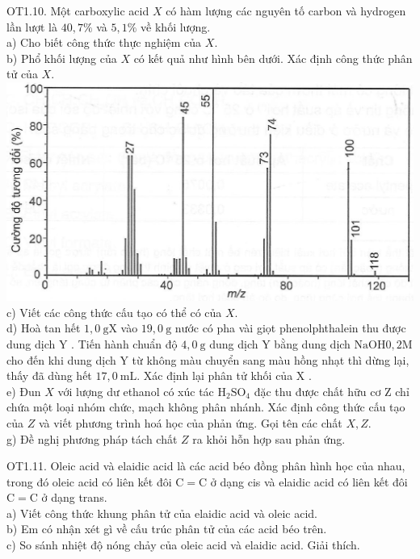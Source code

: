 \documentclass[10pt]{article}
\begin{document}
OT1.10. Một carboxylic acid $X$ có hàm lượng các nguyên tố carbon và hydrogen lần lượt là $40,7 \%$ và $5,1 \%$ về khối lượng.\\
a) Cho biết công thức thực nghiệm của $X$.\\
b) Phổ khối lượng của $X$ có kết quả như hình bên dưới. Xác định công thức phân tử của $X$.\\
\includegraphics[max width=\textwidth, center]{2025_10_23_de6f5713836e4e91b3c8g-014(4)}\\
c) Viết các công thức cấu tạo có thể có của $X$.\\
d) Hoà tan hết $1,0 \mathrm{~g} \mathrm{X}$ vào $19,0 \mathrm{~g}$ nước có pha vài giọt phenolphthalein thu được dung dịch Y . Tiến hành chuẩn độ $4,0 \mathrm{~g}$ dung dịch Y bằng dung dịch $\mathrm{NaOH} 0,2 \mathrm{M}$ cho đến khi dung dịch Y từ không màu chuyển sang màu hồng nhạt thì dừng lại, thấy đã dùng hết $17,0 \mathrm{~mL}$. Xác định lại phân tử khối của X .\\
e) Đun $X$ với lượng dư ethanol có xúc tác $\mathrm{H}_{2} \mathrm{SO}_{4}$ đặc thu được chất hữu cơ Z chỉ chứa một loại nhóm chức, mạch không phân nhánh. Xác định công thức cấu tạo của $Z$ và viết phương trình hoá học của phản ứng. Gọi tên các chất $X, Z$.\\
g) Đề nghị phương pháp tách chất $Z$ ra khỏi hỗn hợp sau phản ứng.

OT1.11. Oleic acid và elaidic acid là các acid béo đồng phân hình học của nhau, trong đó oleic acid có liên kết đôi $\mathrm{C}=\mathrm{C}$ ở dạng cis và elaidic acid có liên kết đôi $\mathrm{C}=\mathrm{C}$ ở dạng trans.\\
a) Viết công thức khung phân tử của elaidic acid và oleic acid.\\
b) Em có nhận xét gì về cấu trúc phân tử của các acid béo trên.\\
c) So sánh nhiệt độ nóng chảy của oleic acid và elaidic acid. Giải thích.
\end{document}
